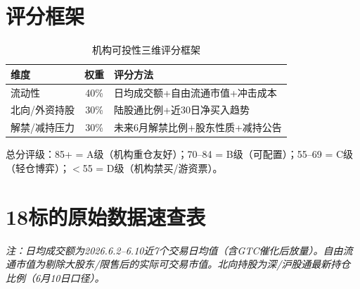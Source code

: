 \section{评分框架}

\begin{table}[H]
\centering\small
\renewcommand{\arraystretch}{1.2}
\begin{tabularx}{\textwidth}{l c X}
\toprule
\textbf{维度} & \textbf{权重} & \textbf{评分方法} \\
\midrule
流动性 & 40\% & 日均成交额+自由流通市值+冲击成本 \\
北向/外资持股 & 30\% & 陆股通比例+近30日净买入趋势 \\
解禁/减持压力 & 30\% & 未来6月解禁比例+股东性质+减持公告 \\
\bottomrule
\end{tabularx}
\caption{机构可投性三维评分框架}
\end{table}

总分评级：85+ = A级（机构重仓友好）；70--84 = B级（可配置）；55--69 = C级（轻仓博弈）；$<$55 = D级（机构禁买/游资票）。

\section{18标的原始数据速查表}

\textit{注：日均成交额为2026.6.2--6.10近7个交易日均值（含GTC催化后放量）。自由流通市值为剔除大股东/限售后的实际可交易市值。北向持股为深/沪股通最新持仓比例（6月10日口径）。}

